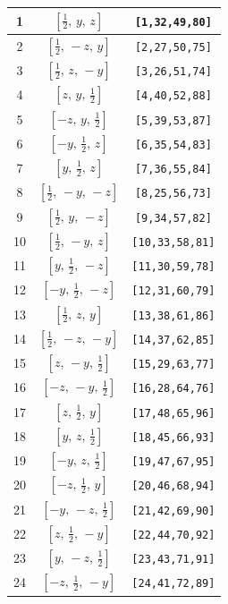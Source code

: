 \documentclass[fleqn,8pt]{jsarticle}
\begin{document}
\begin{longtable}{ccc}
1 & $\left[ \frac{1}{2},\, y,\, z \right]$ & {\tt [1,32,49,80]} \\ \hline
2 & $\left[ \frac{1}{2},\, - z,\, y \right]$ & {\tt [2,27,50,75]} \\ \hline
3 & $\left[ \frac{1}{2},\, z,\, - y \right]$ & {\tt [3,26,51,74]} \\ \hline
4 & $\left[ z,\, y,\, \frac{1}{2} \right]$ & {\tt [4,40,52,88]} \\ \hline
5 & $\left[ - z,\, y,\, \frac{1}{2} \right]$ & {\tt [5,39,53,87]} \\ \hline
6 & $\left[ - y,\, \frac{1}{2},\, z \right]$ & {\tt [6,35,54,83]} \\ \hline
7 & $\left[ y,\, \frac{1}{2},\, z \right]$ & {\tt [7,36,55,84]} \\ \hline
8 & $\left[ \frac{1}{2},\, - y,\, - z \right]$ & {\tt [8,25,56,73]} \\ \hline
9 & $\left[ \frac{1}{2},\, y,\, - z \right]$ & {\tt [9,34,57,82]} \\ \hline
10 & $\left[ \frac{1}{2},\, - y,\, z \right]$ & {\tt [10,33,58,81]} \\ \hline
11 & $\left[ y,\, \frac{1}{2},\, - z \right]$ & {\tt [11,30,59,78]} \\ \hline
12 & $\left[ - y,\, \frac{1}{2},\, - z \right]$ & {\tt [12,31,60,79]} \\ \hline
13 & $\left[ \frac{1}{2},\, z,\, y \right]$ & {\tt [13,38,61,86]} \\ \hline
14 & $\left[ \frac{1}{2},\, - z,\, - y \right]$ & {\tt [14,37,62,85]} \\ \hline
15 & $\left[ z,\, - y,\, \frac{1}{2} \right]$ & {\tt [15,29,63,77]} \\ \hline
16 & $\left[ - z,\, - y,\, \frac{1}{2} \right]$ & {\tt [16,28,64,76]} \\ \hline
17 & $\left[ z,\, \frac{1}{2},\, y \right]$ & {\tt [17,48,65,96]} \\ \hline
18 & $\left[ y,\, z,\, \frac{1}{2} \right]$ & {\tt [18,45,66,93]} \\ \hline
19 & $\left[ - y,\, z,\, \frac{1}{2} \right]$ & {\tt [19,47,67,95]} \\ \hline
20 & $\left[ - z,\, \frac{1}{2},\, y \right]$ & {\tt [20,46,68,94]} \\ \hline
21 & $\left[ - y,\, - z,\, \frac{1}{2} \right]$ & {\tt [21,42,69,90]} \\ \hline
22 & $\left[ z,\, \frac{1}{2},\, - y \right]$ & {\tt [22,44,70,92]} \\ \hline
23 & $\left[ y,\, - z,\, \frac{1}{2} \right]$ & {\tt [23,43,71,91]} \\ \hline
24 & $\left[ - z,\, \frac{1}{2},\, - y \right]$ & {\tt [24,41,72,89]} \\
\end{longtable}
\end{document}
